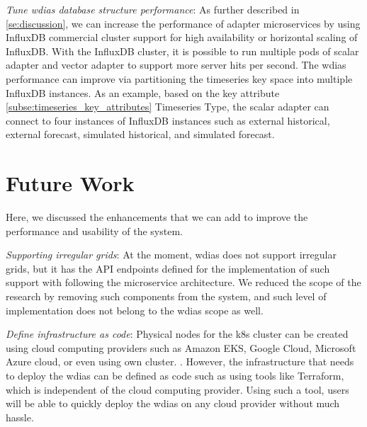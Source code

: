 \emph{Tune \acrshort{wdias} database structure performance}:
As further described in \cref{se:discussion}, we can increase the performance of adapter microservices by using InfluxDB commercial cluster support for high availability or horizontal scaling of InfluxDB. With the InfluxDB cluster, it is possible to run multiple pods of scalar adapter and vector adapter to support more server hits per second. The \acrshort{wdias} performance can improve via partitioning the timeseries key space into multiple InfluxDB instances. As an example, based on the key attribute \cref{subse:timeseries_key_attributes} Timeseries Type, the scalar adapter can connect to four instances of InfluxDB instances such as external historical, external forecast, simulated historical, and simulated forecast.

\section{Future Work}
\label{se:future_work}
Here, we discussed the enhancements that we can add to improve the performance and usability of the system.

\emph{Supporting irregular grids}:
At the moment, \acrshort{wdias} does not support irregular grids, but it has the API endpoints defined for the implementation of such support with following the microservice architecture. We reduced the scope of the research by removing such components from the system, and such level of implementation does not belong to the \acrshort{wdias} scope as well.

\emph{Define infrastructure as code}:
Physical nodes for the \acrshort{k8s} cluster can be created using cloud computing providers such as Amazon EKS, Google Cloud, Microsoft Azure cloud, or even using own cluster. . However, the infrastructure that needs to deploy the \acrshort{wdias} can be defined as code such as using tools like Terraform, which is independent of the cloud computing provider. Using such a tool, users will be able to quickly deploy the \acrshort{wdias} on any cloud provider without much hassle. 

